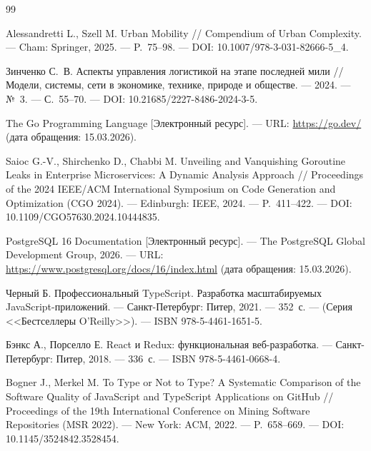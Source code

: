 \begin{thebibliography}{99}
      

      Alessandretti L., Szell M.
      Urban Mobility //
      Compendium of Urban Complexity. ---
      Cham: Springer, 2025. --- P.~75--98. ---
      DOI: 10.1007/978-3-031-82666-5\_4.

      

      Зинченко С.~В.
      Аспекты управления логистикой на этапе последней мили //
      Модели, системы, сети в экономике, технике, природе и обществе. ---
      2024. --- №~3. --- С.~55--70. ---
      DOI: 10.21685/2227-8486-2024-3-5.

      

      The Go Programming Language [Электронный ресурс]. ---
      URL: \url{https://go.dev/} (дата обращения: 15.03.2026).

      

      Saioc G.-V., Shirchenko D., Chabbi M.
      Unveiling and Vanquishing Goroutine Leaks in Enterprise Microservices:
      A Dynamic Analysis Approach //
      Proceedings of the 2024 IEEE/ACM International Symposium on
      Code Generation and Optimization (CGO 2024). ---
      Edinburgh: IEEE, 2024. --- P.~411--422. ---
      DOI: 10.1109/CGO57630.2024.10444835.

      

      PostgreSQL 16 Documentation [Электронный ресурс]. ---
      The PostgreSQL Global Development Group, 2026. ---
      URL: \url{https://www.postgresql.org/docs/16/index.html} (дата обращения: 15.03.2026).

      

      Черный Б.
      Профессиональный TypeScript. Разработка масштабируемых JavaScript-приложений. ---
      Санкт-Петербург: Питер, 2021. --- 352~с. ---
      (Серия <<Бестселлеры O'Reilly>>). ---
      ISBN 978-5-4461-1651-5.

      

      Бэнкс А., Порселло Е.
      React и Redux: функциональная веб-разработка. ---
      Санкт-Петербург: Питер, 2018. --- 336~с. ---
      ISBN 978-5-4461-0668-4.

      

      Bogner J., Merkel M.
      To Type or Not to Type? A Systematic Comparison of the Software Quality
      of JavaScript and TypeScript Applications on GitHub //
      Proceedings of the 19th International Conference on Mining Software
      Repositories (MSR 2022). ---
      New York: ACM, 2022. --- P.~658--669. ---
      DOI: 10.1145/3524842.3528454.


\end{thebibliography}
